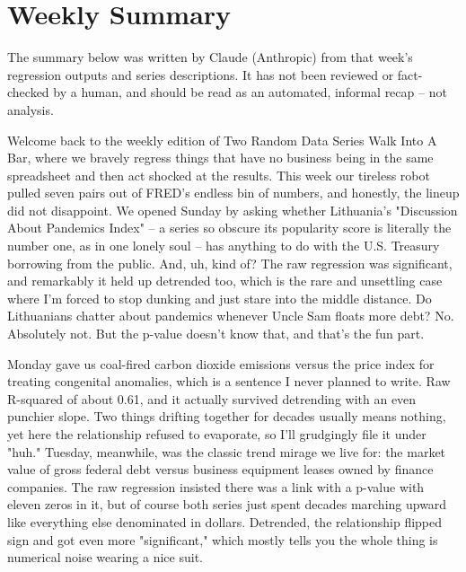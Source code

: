 \section{Weekly Summary}

\begin{tcolorbox}[colback=yellow!10,colframe=black!50,title=AI-Generated Content]
\noindent The summary below was written by Claude (Anthropic) from that week's regression outputs and series descriptions. It has not been reviewed or fact-checked by a human, and should be read as an automated, informal recap -- not analysis.
\end{tcolorbox}

Welcome back to the weekly edition of Two Random Data Series Walk Into A Bar, where we bravely regress things that have no business being in the same spreadsheet and then act shocked at the results. This week our tireless robot pulled seven pairs out of FRED's endless bin of numbers, and honestly, the lineup did not disappoint. We opened Sunday by asking whether Lithuania's "Discussion About Pandemics Index" -- a series so obscure its popularity score is literally the number one, as in one lonely soul -- has anything to do with the U.S. Treasury borrowing from the public. And, uh, kind of? The raw regression was significant, and remarkably it held up detrended too, which is the rare and unsettling case where I'm forced to stop dunking and just stare into the middle distance. Do Lithuanians chatter about pandemics whenever Uncle Sam floats more debt? No. Absolutely not. But the p-value doesn't know that, and that's the fun part.

Monday gave us coal-fired carbon dioxide emissions versus the price index for treating congenital anomalies, which is a sentence I never planned to write. Raw R-squared of about 0.61, and it actually survived detrending with an even punchier slope. Two things drifting together for decades usually means nothing, yet here the relationship refused to evaporate, so I'll grudgingly file it under "huh." Tuesday, meanwhile, was the classic trend mirage we live for: the market value of gross federal debt versus business equipment leases owned by finance companies. The raw regression insisted there was a link with a p-value with eleven zeros in it, but of course both series just spent decades marching upward like everything else denominated in dollars. Detrended, the relationship flipped sign and got even more "significant," which mostly tells you the whole thing is numerical noise wearing a nice suit.

